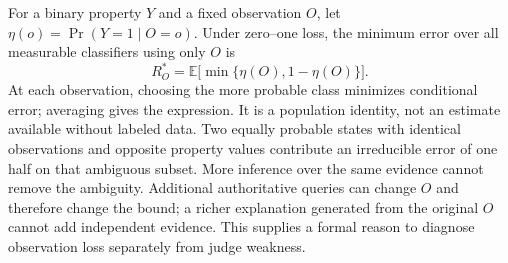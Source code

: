 For a binary property $Y$ and a fixed observation $O$, let $\eta(o)=\Pr(Y=1\mid O=o)$. Under zero--one loss, the minimum error over all measurable classifiers using only $O$ is
\begin{equation}
 R_O^*=\mathbb E\big[\min\{\eta(O),1-\eta(O)\}\big].
\end{equation}
At each observation, choosing the more probable class minimizes conditional error; averaging gives the expression. It is a population identity, not an estimate available without labeled data. Two equally probable states with identical observations and opposite property values contribute an irreducible error of one half on that ambiguous subset. More inference over the same evidence cannot remove the ambiguity. Additional authoritative queries can change $O$ and therefore change the bound; a richer explanation generated from the original $O$ cannot add independent evidence. This supplies a formal reason to diagnose observation loss separately from judge weakness.
